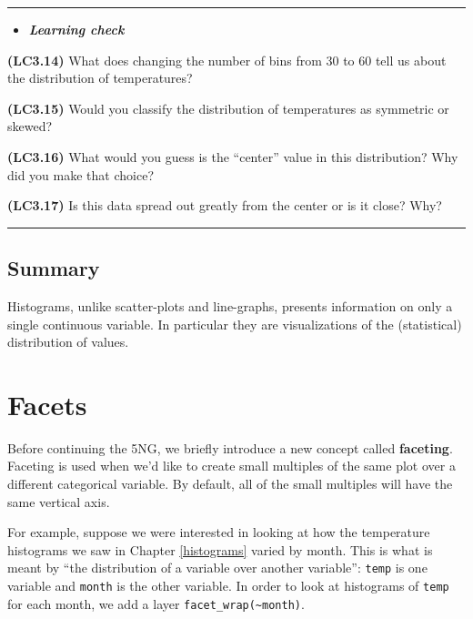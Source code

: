\documentclass[]{tufte-book}
\let\oldrule=\rule
\renewcommand{\rule}[1]{\oldrule{\linewidth}}
\newenvironment{rmdblock}[1]
  {\begin{shaded*}
  \begin{itemize}
  \renewcommand{\labelitemi}{
    \raisebox{-.7\height}[0pt][0pt]{
    }
  }
  \item
  }
  {
  \end{itemize}
  \end{shaded*}
  }
\newenvironment{learncheck}
  {\begin{rmdblock}{warning}}
  {\end{rmdblock}}
\begin{document}
\begin{center}\rule{0.5\linewidth}{\linethickness}\end{center}

\begin{learncheck}
\textbf{\emph{Learning check}}
\end{learncheck}

\textbf{(LC3.14)} What does changing the number of bins from 30 to 60
tell us about the distribution of temperatures?

\textbf{(LC3.15)} Would you classify the distribution of temperatures as
symmetric or skewed?

\textbf{(LC3.16)} What would you guess is the ``center'' value in this
distribution? Why did you make that choice?

\textbf{(LC3.17)} Is this data spread out greatly from the center or is
it close? Why?

\begin{center}\rule{0.5\linewidth}{\linethickness}\end{center}

\subsection{Summary}\label{summary-2}

Histograms, unlike scatter-plots and line-graphs, presents information
on only a single continuous variable. In particular they are
visualizations of the (statistical) distribution of values.

\section{Facets}\label{facets}

Before continuing the 5NG, we briefly introduce a new concept called
\textbf{faceting}. Faceting is used when we'd like to create small
multiples of the same plot over a different categorical variable. By
default, all of the small multiples will have the same vertical axis.

For example, suppose we were interested in looking at how the
temperature histograms we saw in Chapter \ref{histograms} varied by
month. This is what is meant by ``the distribution of a variable over
another variable'': \texttt{temp} is one variable and \texttt{month} is
the other variable. In order to look at histograms of \texttt{temp} for
each month, we add a layer \texttt{facet\_wrap(\textasciitilde{}month)}.
\end{document}
